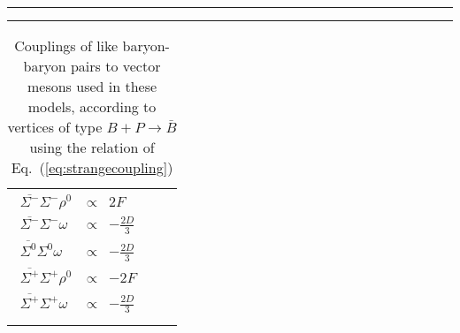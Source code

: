 \documentclass[11pt,a4paper,twoside]{carrollthesis}
\begin{document}
\begin{table}[!b]
\caption[$F$- and $D$-style couplings for
  $\bar{B}BP$]{\protect\label{tab:FDcouplings}Couplings of like
  baryon-baryon pairs to vector mesons used in these models, according
  to vertices of type $B + P \to \bar{B}$ using the relation of
  Eq.~(\ref{eq:strangecoupling})}
\begin{center}
\hrule
\vspace{1mm}
\hrule
\vspace{2mm}
\hspace{0.2cm}
\centering
\begin{tabular}{ccc}
\begin{minipage}[c]{0.3\textwidth}
$\begin{array}{lrr}
\overline{\Sigma^-}\Sigma^-\rho^0  \  & \propto &    2F                    \\[2mm]
\overline{\Sigma^-}\Sigma^-\omega  \  & \propto &    -\frac{2D}{3}         \\[2mm]
\overline{\Sigma^0}\Sigma^0\omega  \  & \propto &    -\frac{2D}{3}         \\[2mm]
\overline{\Sigma^+}\Sigma^+\rho^0  \  & \propto &    -2   F                \\[2mm]
\overline{\Sigma^+}\Sigma^+\omega  \  & \propto &    -\frac{2D}{3}         \\[2mm]
 \end{array}$
 \end{minipage}
 & 
 \begin{minipage}[c]{0.3\textwidth}

\end{minipage}
\end{tabular}
\end{center}
\end{table}
\end{document}
